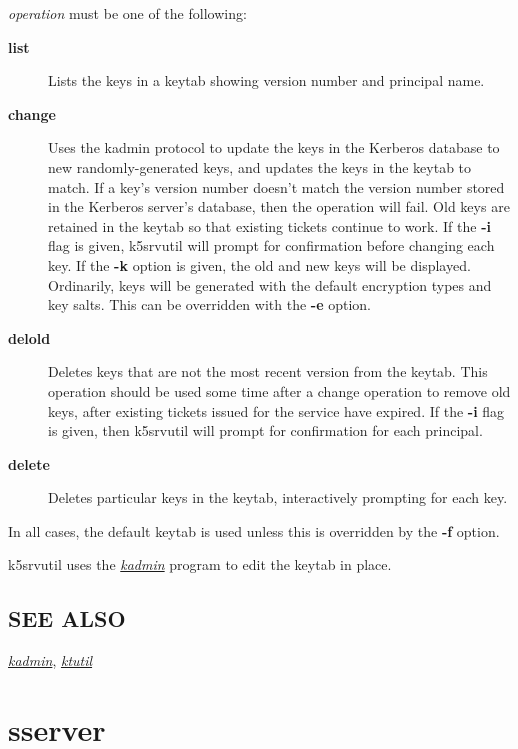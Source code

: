 \documentclass[letterpaper,10pt,english]{sphinxmanual}
\begin{document}
\emph{operation} must be one of the following:
\begin{description}
\item[{\textbf{list}}] \leavevmode
Lists the keys in a keytab showing version number and principal
name.

\item[{\textbf{change}}] \leavevmode
Uses the kadmin protocol to update the keys in the Kerberos
database to new randomly-generated keys, and updates the keys in
the keytab to match.  If a key's version number doesn't match the
version number stored in the Kerberos server's database, then the
operation will fail.  Old keys are retained in the keytab so that
existing tickets continue to work.  If the \textbf{-i} flag is given,
k5srvutil will prompt for confirmation before changing each key.
If the \textbf{-k} option is given, the old and new keys will be
displayed.  Ordinarily, keys will be generated with the default
encryption types and key salts.  This can be overridden with the
\textbf{-e} option.

\item[{\textbf{delold}}] \leavevmode
Deletes keys that are not the most recent version from the keytab.
This operation should be used some time after a change operation
to remove old keys, after existing tickets issued for the service
have expired.  If the \textbf{-i} flag is given, then k5srvutil will
prompt for confirmation for each principal.

\item[{\textbf{delete}}] \leavevmode
Deletes particular keys in the keytab, interactively prompting for
each key.

\end{description}

In all cases, the default keytab is used unless this is overridden by
the \textbf{-f} option.

k5srvutil uses the {\hyperref[admin/admin_commands/kadmin_local:kadmin-1]{\emph{kadmin}}} program to edit the keytab in
place.


\subsection{SEE ALSO}
\label{admin/admin_commands/k5srvutil:see-also}
{\hyperref[admin/admin_commands/kadmin_local:kadmin-1]{\emph{kadmin}}}, {\hyperref[admin/admin_commands/ktutil:ktutil-1]{\emph{ktutil}}}


\section{sserver}
\label{admin/admin_commands/sserver:sserver-8}\label{admin/admin_commands/sserver::doc}\label{admin/admin_commands/sserver:sserver}
\end{document}
